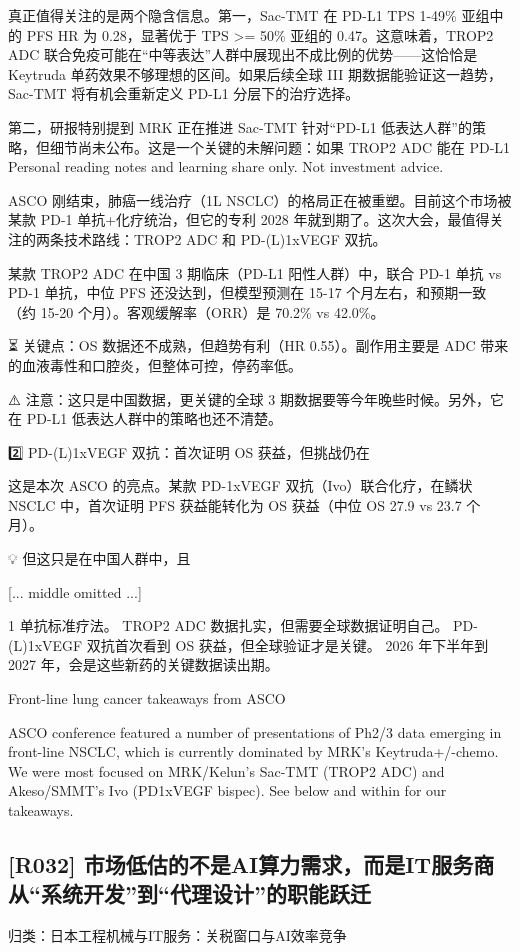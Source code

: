 \documentclass[11pt]{ctexart}
\begin{document}
真正值得关注的是两个隐含信息。第一，Sac-TMT 在 PD-L1 TPS 1-49\% 亚组中的 PFS HR 为 0.28，显著优于 TPS >= 50\% 亚组的 0.47。这意味着，TROP2 ADC 联合免疫可能在“中等表达”人群中展现出不成比例的优势——这恰恰是 Keytruda 单药效果不够理想的区间。如果后续全球 III 期数据能验证这一趋势，Sac-TMT 将有机会重新定义 PD-L1 分层下的治疗选择。

第二，研报特别提到 MRK 正在推进 Sac-TMT 针对“PD-L1 低表达人群”的策略，但细节尚未公布。这是一个关键的未解问题：如果 TROP2 ADC 能在 PD-L1 Personal reading notes and learning share only. Not investment advice.

ASCO 刚结束，肺癌一线治疗（1L NSCLC）的格局正在被重塑。目前这个市场被某款 PD-1 单抗+化疗统治，但它的专利 2028 年就到期了。这次大会，最值得关注的两条技术路线：TROP2 ADC 和 PD-(L)1xVEGF 双抗。

某款 TROP2 ADC 在中国 3 期临床（PD-L1 阳性人群）中，联合 PD-1 单抗 vs PD-1 单抗，中位 PFS 还没达到，但模型预测在 15-17 个月左右，和预期一致（约 15-20 个月）。客观缓解率（ORR）是 70.2\% vs 42.0\%。

⏳ 关键点：OS 数据还不成熟，但趋势有利（HR 0.55）。副作用主要是 ADC 带来的血液毒性和口腔炎，但整体可控，停药率低。

⚠️ 注意：这只是中国数据，更关键的全球 3 期数据要等今年晚些时候。另外，它在 PD-L1 低表达人群中的策略也还不清楚。

2️⃣ PD-(L)1xVEGF 双抗：首次证明 OS 获益，但挑战仍在

这是本次 ASCO 的亮点。某款 PD-1xVEGF 双抗（Ivo）联合化疗，在鳞状 NSCLC 中，首次证明 PFS 获益能转化为 OS 获益（中位 OS 27.9 vs 23.7 个月）。

💡 但这只是在中国人群中，且

[... middle omitted ...]

1 单抗标准疗法。 TROP2 ADC 数据扎实，但需要全球数据证明自己。 PD-(L)1xVEGF 双抗首次看到 OS 获益，但全球验证才是关键。 2026 年下半年到 2027 年，会是这些新药的关键数据读出期。

Front-line lung cancer takeaways from ASCO

ASCO conference featured a number of presentations of Ph2/3 data emerging in front-line NSCLC, which is currently dominated by MRK's Keytruda+/-chemo. We were most focused on MRK/Kelun's Sac-TMT (TROP2 ADC) and Akeso/SMMT's Ivo (PD1xVEGF bispec). See below and within for our takeaways.

\subsection{[R032] 市场低估的不是AI算力需求，而是IT服务商从“系统开发”到“代理设计”的职能跃迁}
{\small\color{refgray}归类：日本工程机械与IT服务：关税窗口与AI效率竞争}
\end{document}
